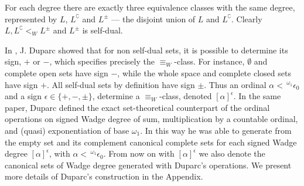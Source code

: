 For each degree there are exactly three equivalence
classes with the same degree, represented by $L$, $L^\complement$ and
$L^\pm$ --- the disjoint union of $L$ and $L^\complement$. %
Clearly $L, L^\complement <_W L^\pm$ and
$L^\pm$ is self-dual.

In \cite{dup1}, J. Duparc showed that for non self-dual sets, it is possible to determine its sign, $+$
or $-$, which specifies precisely the $\equiv_W$-class. 
For instance, $\emptyset$ and complete open sets have sign $-$, while the whole space and complete closed  sets have sign $+$.
  All self-dual sets by
definition have sign $\pm$. Thus an ordinal $\alpha <\,
{}^{\omega_1}\epsilon_0$ and a sign $\epsilon \in \{+,-,\pm\}$,
determine a $\equiv_W$-class, denoted  $[\alpha]^\epsilon$. %
In the same paper, Duparc defined the exact set-theoretical counterpart of the ordinal operations on signed Wadge degree of sum, multiplication by a countable ordinal, and (quasi) exponentiation of base $\omega_1$. In this way he was able to generate from the empty set and its complement canonical complete sets for each signed Wadge degree $[\alpha]^\epsilon$, with $\alpha <\,
{}^{\omega_1}\epsilon_0$. 
From now on with $[\alpha]^\epsilon$ we also denote the canonical sets of Wadge degree generated with Duparc's operations. We present more details of Duparc's construction in the Appendix.
